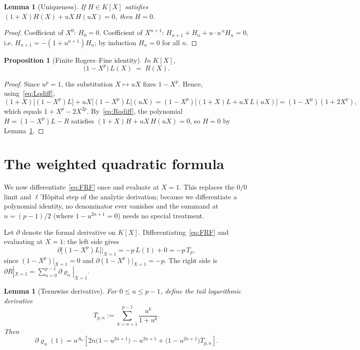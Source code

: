 \documentclass[11pt]{article}
\newtheorem{lemma}[theorem]{Lemma}
\newtheorem{proposition}[theorem]{Proposition}
\theoremstyle{definition}
\begin{document}
\begin{lemma}[Uniqueness]\label{lem:rfunique}
If $H\in K[X]$ satisfies $(1+X)H(X)+uX\,H(uX)=0$, then $H=0$.
\end{lemma}

\begin{proof}
Coefficient of $X^{0}$: $H_0=0$. Coefficient of $X^{n+1}$: $H_{n+1}+H_{n}+u\cdot u^{\,n}H_{n}=0$, i.e. $H_{n+1}=-(1+u^{n+1})H_n$; by induction $H_n=0$ for all $n$.
\end{proof}

\begin{proposition}[Finite Rogers--Fine identity]\label{prop:rf}
In $K[X]$,
\begin{equation}\label{eq:FRF}
  \bigl(1-X^{p}\bigr)\,L(X)\;=\;R(X).
\end{equation}
\end{proposition}

\begin{proof}
Since $u^{p}=1$, the substitution $X\mapsto uX$ fixes $1-X^{p}$. Hence, using~\eqref{eq:Lqdiff},
\[
  (1+X)\bigl[(1-X^p)L\bigr]+uX\bigl[(1-X^p)L\bigr](uX)
  =(1-X^{p})\bigl[(1+X)L+uX\,L(uX)\bigr]
  =(1-X^{p})(1+2X^{p}),
\]
which equals $1+X^{p}-2X^{2p}$. By~\eqref{eq:Rqdiff}, the polynomial $H=(1-X^{p})L-R$ satisfies $(1+X)H+uX\,H(uX)=0$, so $H=0$ by Lemma~\ref{lem:rfunique}.
\end{proof}

\section{The weighted quadratic formula}\label{sec:weighted}

We now differentiate~\eqref{eq:FRF} once and evaluate at $X=1$. This replaces the $0/0$ limit and $\ell$'H\^opital step of the analytic derivation; because we differentiate a polynomial identity, no denominator ever vanishes and the summand at $n=(p-1)/2$ (where $1-u^{2n+1}=0$) needs no special treatment.

Let $\partial$ denote the formal derivative on $K[X]$. Differentiating~\eqref{eq:FRF} and evaluating at $X=1$: the left side gives
\[
  \partial\bigl[(1-X^{p})L\bigr]\big|_{X=1}=-p\,L(1)+0=-p\,T_p,
\]
since $(1-X^{p})|_{X=1}=0$ and $\partial(1-X^{p})|_{X=1}=-p$. The right side is $\partial R|_{X=1}=\sum_{n=0}^{p-1}\partial\varrho_n|_{X=1}$.

\begin{lemma}[Termwise derivative]\label{lem:termderiv}
For $0\le n\le p-1$, define the tail logarithmic derivative
\[
  T_{p,n}:=\sum_{k=n+1}^{p-1}\frac{u^k}{1+u^k}.
\]
Then
\[
  \partial\varrho_n(1)
  =
  u^{A_n}
  \left[
    2n\bigl(1-u^{2n+1}\bigr)
    -u^{2n+1}
    +\bigl(1-u^{2n+1}\bigr)T_{p,n}
  \right].
\]
\end{lemma}
\end{document}
